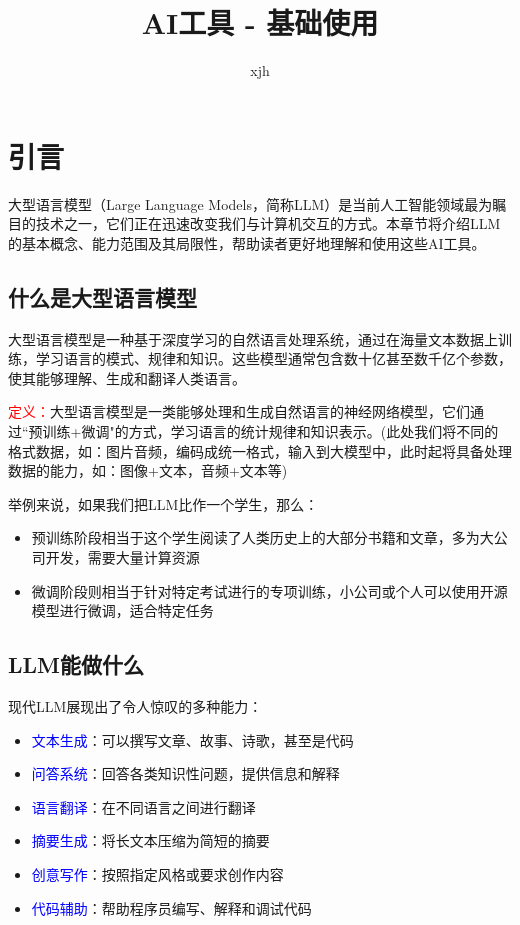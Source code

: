 \documentclass{article}
\title{AI工具 - 基础使用}
\author{xjh}
\begin{document}
\maketitle

\section{引言}
大型语言模型（Large Language Models，简称LLM）是当前人工智能领域最为瞩目的技术之一，它们正在迅速改变我们与计算机交互的方式。本章节将介绍LLM的基本概念、能力范围及其局限性，帮助读者更好地理解和使用这些AI工具。

\subsection{什么是大型语言模型}
大型语言模型是一种基于深度学习的自然语言处理系统，通过在海量文本数据上训练，学习语言的模式、规律和知识。这些模型通常包含数十亿甚至数千亿个参数，使其能够理解、生成和翻译人类语言。

\textcolor{red}{定义：}大型语言模型是一类能够处理和生成自然语言的神经网络模型，它们通过``预训练+微调"的方式，学习语言的统计规律和知识表示。(此处我们将不同的格式数据，如：图片音频，编码成统一格式，输入到大模型中，此时起将具备处理数据的能力，如：图像+文本，音频+文本等)

举例来说，如果我们把LLM比作一个学生，那么：
\begin{itemize}
  \item 预训练阶段相当于这个学生阅读了人类历史上的大部分书籍和文章，多为大公司开发，需要大量计算资源
  \item 微调阶段则相当于针对特定考试进行的专项训练，小公司或个人可以使用开源模型进行微调，适合特定任务
\end{itemize}

\subsection{LLM能做什么}
现代LLM展现出了令人惊叹的多种能力：

\begin{itemize}
  \item \textcolor{blue}{文本生成}：可以撰写文章、故事、诗歌，甚至是代码
  \item \textcolor{blue}{问答系统}：回答各类知识性问题，提供信息和解释
  \item \textcolor{blue}{语言翻译}：在不同语言之间进行翻译
  \item \textcolor{blue}{摘要生成}：将长文本压缩为简短的摘要
  \item \textcolor{blue}{创意写作}：按照指定风格或要求创作内容
  \item \textcolor{blue}{代码辅助}：帮助程序员编写、解释和调试代码
\end{itemize}
\end{document}
